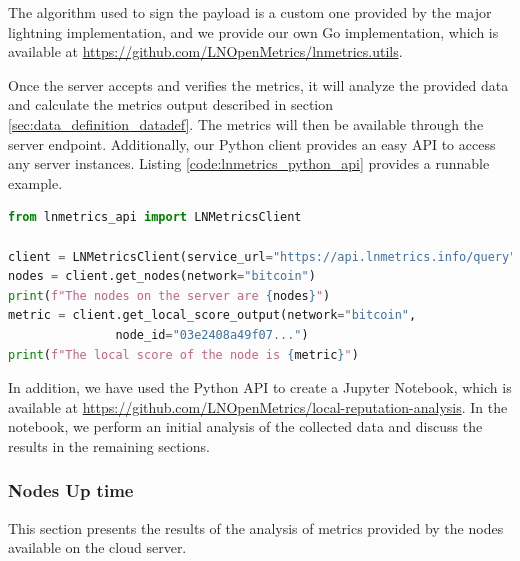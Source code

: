 The algorithm used to sign the payload is a custom one provided by the major
lightning implementation, and we provide our own Go implementation, which is available
at \url{https://github.com/LNOpenMetrics/lnmetrics.utils}.

Once the server accepts and verifies the metrics, it will analyze the provided data and calculate the
metrics output described in section \ref{sec:data_definition_datadef}. The metrics will then be available
through the server endpoint. Additionally, our Python client provides an easy API to access any server instances.
Listing \ref{code:lnmetrics_python_api} provides a runnable example.

\begin{lstlisting}[language=python, basicstyle=\small,
                  caption={Python script to show a runnable example of our Python wrapper API usage.}, 
                  label={code:lnmetrics_python_api}]
from lnmetrics_api import LNMetricsClient

client = LNMetricsClient(service_url="https://api.lnmetrics.info/query")
nodes = client.get_nodes(network="bitcoin")
print(f"The nodes on the server are {nodes}")
metric = client.get_local_score_output(network="bitcoin", 
               node_id="03e2408a49f07...")
print(f"The local score of the node is {metric}")
\end{lstlisting}

In addition, we have used the Python API to create a Jupyter Notebook, which 
is available at \url{https://github.com/LNOpenMetrics/local-reputation-analysis}.
In the notebook, we perform an initial analysis of the collected data and discuss 
the results in the remaining sections.

\subsubsection{Nodes Up time}
\label{sec:node_uptime}
This section presents the results of the analysis of metrics provided by the
nodes available on the cloud server.

